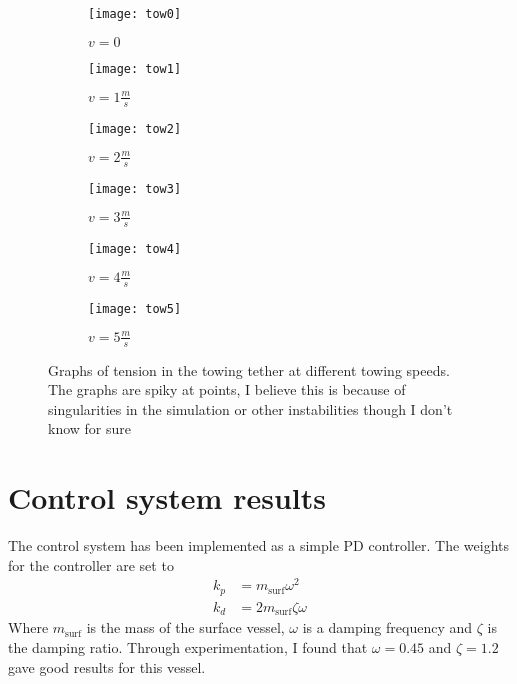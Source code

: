 \begin{figure}
	\centering
	\begin{subfigure}[b]{0.45\textwidth}
		\centering
		\texttt{[image: tow0]}
		\caption{\(v=0\)}
	\end{subfigure}
	\hfill
	\begin{subfigure}[b]{0.45\textwidth}
		\centering
		\texttt{[image: tow1]}
		\caption{\(v=1\frac{m}{s}\)}
	\end{subfigure}
	\vfill
	\begin{subfigure}[b]{0.45\textwidth}
		\centering
		\texttt{[image: tow2]}
		\caption{\(v=2\frac{m}{s}\)}
	\end{subfigure}
	\hfill
	\begin{subfigure}[b]{0.45\textwidth}
		\centering
		\texttt{[image: tow3]}
		\caption{\(v=3\frac{m}{s}\)}
	\end{subfigure}
	\vfill
	\begin{subfigure}[b]{0.45\textwidth}
		\centering
		\texttt{[image: tow4]}
		\caption{\(v=4\frac{m}{s}\)}
	\end{subfigure}
	\hfill
	\begin{subfigure}[b]{0.45\textwidth}
		\centering
		\texttt{[image: tow5]}
		\caption{\(v=5\frac{m}{s}\)}
	\end{subfigure}
	\caption{Graphs of tension in the towing tether at different towing speeds. The graphs are spiky at points, I believe this is because of singularities in the simulation or other instabilities though I don't know for sure}
	\label{fig:tensions}
\end{figure}

\section{Control system results}
The control system has been implemented as a simple PD controller. The weights for the controller are set to 
\begin{align*}
k_p &= m_{\text{surf}}\omega^2 \\
k_d &= 2m_{\text{surf}}\zeta\omega
\end{align*}
Where \(m_{\text{surf}}\) is the mass of the surface vessel, \(\omega\) is a damping frequency and \(\zeta\) is the damping ratio. Through experimentation, I found that \(\omega = 0.45\) and \(\zeta = 1.2\) gave good results for this vessel. 

